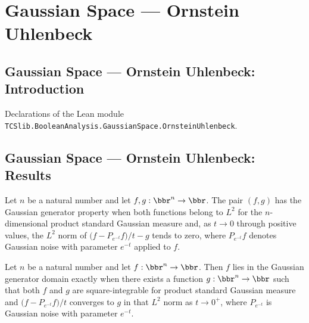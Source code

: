 \section{Gaussian Space --- Ornstein Uhlenbeck}
\subsection*{Gaussian Space --- Ornstein Uhlenbeck: Introduction}

Declarations of the Lean module \texttt{TCSlib.BooleanAnalysis.GaussianSpace.OrnsteinUhlenbeck}.

\subsection*{Gaussian Space --- Ornstein Uhlenbeck: Results}

\begin{definition}
\label{BooleanAnalysis.GaussianSpace.HasGaussianGenerator}
\leanok
{}
Let $n$ be a natural number and let $f,g:\bbr^n\to\bbr$. The pair $(f,g)$ has the
Gaussian generator property when both functions belong to $L^2$ for the $n$-dimensional
product standard Gaussian measure and, as $t\to0$ through positive values, the $L^2$
norm of $\bigl(f-P_{e^{-t}}f\bigr)/t-g$ tends to zero, where $P_{e^{-t}}f$ denotes
Gaussian noise with parameter $e^{-t}$ applied to $f$.
\end{definition}

\begin{definition}
\label{BooleanAnalysis.GaussianSpace.InGaussianGeneratorDomain}
\leanok
{}
Let $n$ be a natural number and let $f:\bbr^n\to\bbr$. Then $f$ lies in the Gaussian
generator domain exactly when there exists a function $g:\bbr^n\to\bbr$ such that both
$f$ and $g$ are square-integrable for product standard Gaussian measure and
$\bigl(f-P_{e^{-t}}f\bigr)/t$ converges to $g$ in that $L^2$ norm as $t\to0^+$, where
$P_{e^{-t}}$ is Gaussian noise with parameter $e^{-t}$.
\end{definition}

